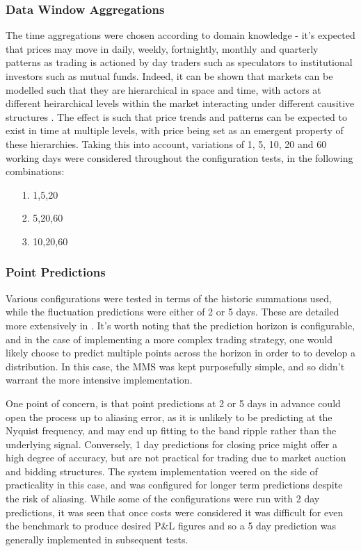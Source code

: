\documentclass[a4paper,11pt,oneside]{article}
\theoremstyle{plain}
\theoremstyle{definition}
\begin{document}
\subsubsection{Data Window Aggregations} The time aggregations were chosen according to domain knowledge - it's expected that prices may move in daily, weekly, fortnightly, monthly and quarterly patterns as trading is actioned by day traders such as speculators to institutional investors such as mutual funds. Indeed, it can be shown that markets can be modelled such that they are hierarchical in space and time, with actors at different heirarchical levels within the market interacting under different causitive structures \cite{Wilcox}. The effect is such that price trends and patterns can be expected to exist in time at multiple levels, with price being set as an emergent property of these hierarchies. Taking this into account, variations of 1, 5, 10, 20 and 60 working days were considered throughout the configuration tests, in the following combinations:  
\begin{itemize}
	\item[1.] 1,5,20 
	\item[2.] 5,20,60
	\item[3.] 10,20,60
\end{itemize}

\subsubsection {Point Predictions} Various configurations were tested in terms of the historic summations used, while the fluctuation predictions were either of 2 or 5 days. These are detailed more extensively in . It's worth noting that the prediction horizon is configurable, and in the case of implementing a more complex trading strategy, one would likely choose to predict multiple points across the horizon in order to to develop a distribution. In this case, the MMS was kept purposefully simple, and so didn't warrant the more intensive implementation. \newline

One point of concern, is that point predictions at 2 or 5 days in advance could open the process up to aliasing error, as it is unlikely to be predicting at the Nyquist frequency, and may end up fitting to the band ripple rather than the underlying signal. Conversely, 1 day predictions for closing price might offer a high degree of accuracy, but are not practical for trading due to market auction and bidding structures. The system implementation veered on the side of practicality in this case, and was configured for longer term predictions despite the risk of aliasing. While some of the configurations were run with 2 day predictions, it was seen that once costs were considered it was difficult for even the benchmark to produce desired P\&L figures and so a 5 day prediction was generally implemented in subsequent tests. 
\end{document}
